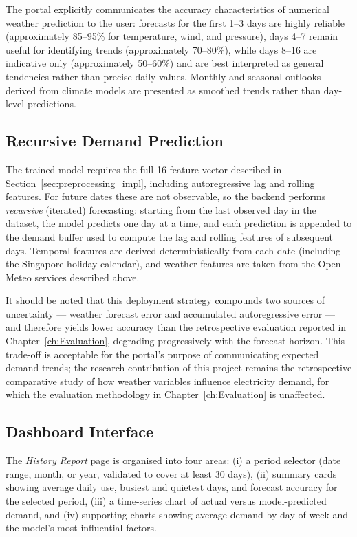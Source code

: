 The portal explicitly communicates the accuracy characteristics of numerical weather prediction to the user: forecasts for the first 1--3 days are highly reliable (approximately 85--95\% for temperature, wind, and pressure), days 4--7 remain useful for identifying trends (approximately 70--80\%), while days 8--16 are indicative only (approximately 50--60\%) and are best interpreted as general tendencies rather than precise daily values. Monthly and seasonal outlooks derived from climate models are presented as smoothed trends rather than day-level predictions.

\subsection{Recursive Demand Prediction}

The trained model requires the full 16-feature vector described in Section~\ref{sec:preprocessing_impl}, including autoregressive lag and rolling features. For future dates these are not observable, so the backend performs \emph{recursive} (iterated) forecasting: starting from the last observed day in the dataset, the model predicts one day at a time, and each prediction is appended to the demand buffer used to compute the lag and rolling features of subsequent days. Temporal features are derived deterministically from each date (including the Singapore holiday calendar), and weather features are taken from the Open-Meteo services described above.

It should be noted that this deployment strategy compounds two sources of uncertainty --- weather forecast error and accumulated autoregressive error --- and therefore yields lower accuracy than the retrospective evaluation reported in Chapter~\ref{ch:Evaluation}, degrading progressively with the forecast horizon. This trade-off is acceptable for the portal's purpose of communicating expected demand trends; the research contribution of this project remains the retrospective comparative study of how weather variables influence electricity demand, for which the evaluation methodology in Chapter~\ref{ch:Evaluation} is unaffected.

\subsection{Dashboard Interface}

The \emph{History Report} page is organised into four areas: (i) a period selector (date range, month, or year, validated to cover at least 30 days), (ii) summary cards showing average daily use, busiest and quietest days, and forecast accuracy for the selected period, (iii) a time-series chart of actual versus model-predicted demand, and (iv) supporting charts showing average demand by day of week and the model's most influential factors.


